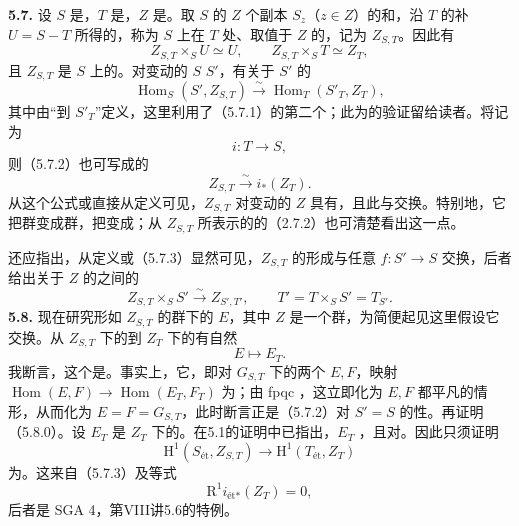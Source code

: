 \textbf{5.7.} 设 $S$ 是，$T$ 是，$Z$ 是。取 $S$ 的 $Z$ 个副本 $S_z$（$z\in Z$）的和，沿 $T$ 的补 $U=S-T$ 所得的，称为 $S$ 上在 $T$ 处、取值于 $Z$ 的，记为 $Z_{S,T}$。因此有
\[
Z_{S,T}\times_SU\simeq U,\qquad Z_{S,T}\times_ST\simeq Z_T,\tag{5.7.1}
\]
且 $Z_{S,T}$ 是 $S$ 上的。对变动的 $S$  $S'$，有关于 $S'$ 的
\[
\operatorname{Hom}_S(S',Z_{S,T})\xrightarrow{\sim}\operatorname{Hom}_T(S'_T,Z_T),\tag{5.7.2}
\]
其中由“到 $S'_T$”定义，这里利用了（5.7.1）的第二个；此为的验证留给读者。将记为
\[i:T\longrightarrow S,\]
则（5.7.2）也可写成的
\[
Z_{S,T}\xrightarrow{\sim}i_*(Z_T).\tag{5.7.3}
\]
从这个公式或直接从定义可见，$Z_{S,T}$ 对变动的 $Z$ 具有，且此与交换。特别地，它把群变成群，把变成；从 $Z_{S,T}$ 所表示的的（2.7.2）也可清楚看出这一点。

还应指出，从定义或（5.7.3）显然可见，$Z_{S,T}$ 的形成与任意 $f:S'\to S$ 交换，后者给出关于 $Z$ 的之间的
\[
Z_{S,T}\times_SS'\xrightarrow{\sim}Z_{S',T'},\qquad T'=T\times_SS'=T_{S'}.\tag{5.7.4}
\]
\textbf{5.8.} 现在研究形如 $Z_{S,T}$ 的群下的 $E$，其中 $Z$ 是一个群，为简便起见这里假设它交换。从 $Z_{S,T}$ 下的到 $Z_T$ 下的有自然
\[
E\longmapsto E_T.\tag{5.8.0}
\]
我断言，这个是。事实上，它，即对 $G_{S,T}$ 下的两个 $E,F$，映射 $\operatorname{Hom}(E,F)\to\operatorname{Hom}(E_T,F_T)$ 为；由 fpqc ，这立即化为 $E,F$
都平凡的情形，从而化为 $E=F=G_{S,T}$，此时断言正是（5.7.2）对 $S'=S$ 的性。再证明（5.8.0）。设 $E_T$ 是 $Z_T$ 下的。在5.1的证明中已指出，$E_T$ ，且对。因此只须证明
\[\mathrm H^1(S_{\text{ét}},Z_{S,T})\longrightarrow\mathrm H^1(T_{\text{ét}},Z_T)\]
为。这来自（5.7.3）及等式
\[\mathrm R^1i_{\text{ét}*}(Z_T)=0,\]
后者是 SGA 4，第VIII讲5.6的特例。

